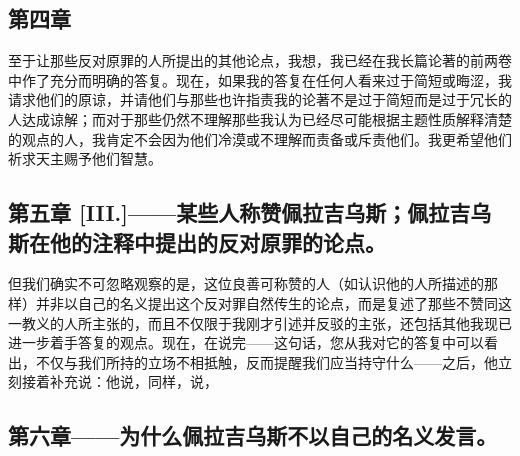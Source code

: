 
\subsection{第四章}

至于让那些反对原罪的人所提出的其他论点，我想，我已经在我长篇论著的前两卷中作了充分而明确的答复。现在，如果我的答复在任何人看来过于简短或晦涩，我请求他们的原谅，并请他们与那些也许指责我的论著不是过于简短而是过于冗长的人达成谅解；而对于那些仍然不理解那些我认为已经尽可能根据主题性质解释清楚的观点的人，我肯定不会因为他们冷漠或不理解而责备或斥责他们。我更希望他们祈求天主赐予他们智慧。\par


\subsection{第五章 [III.]——某些人称赞佩拉吉乌斯；佩拉吉乌斯在他的注释中提出的反对原罪的论点。}

但我们确实不可忽略观察的是，这位良善可称赞的人（如认识他的人所描述的那样）并非以自己的名义提出这个反对罪自然传生的论点，而是复述了那些不赞同这一教义的人所主张的，而且不仅限于我刚才引述并反驳的主张，还包括其他我现已进一步着手答复的观点。现在，在说完——这句话，您从我对它的答复中可以看出，不仅与我们所持的立场不相抵触，反而提醒我们应当持守什么——之后，他立刻接着补充说：他说，同样，说，\par


\subsection{第六章——为什么佩拉吉乌斯不以自己的名义发言。}

